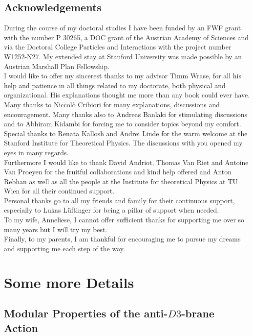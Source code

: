 \documentclass[12pt]{report}
\begin{document}
\section*{Acknowledgements}
During the course of my doctoral studies I have been funded by an FWF grant with the number P 30265, a DOC grant of the Austrian Academy of Sciences and via the Doctoral College Particles  and Interactions with the project  number W1252-N27. My extended stay at Stanford University was made possible by an Austrian Marshall Plan Fellowship.\\
I would like to offer my sincerest thanks to my advisor Timm Wrase, for all his help and patience in all things related to my doctorate, both physical and organizational. His explanations thought me more than any book could ever have.\\
Many thanks to Niccol\`o Cribiori for many explanations, discussions and encouragement. Many thanks also to Andreas Banlaki for stimulating discussions and to Abhiram Kidambi for forcing me to consider topics beyond my comfort.\\
Special thanks to Renata Kallosh and Andrei Linde for the warm welcome at the Stanford Institute for Theoretical Physics. The discussions with you opened my eyes in many regards.\\
Furthermore I would like to thank David Andriot, Thomas Van Riet and Antoine Van Proeyen for the fruitful collaborations and kind help offered and Anton Rebhan as well as all the people at the Institute  for theoretical Physics at TU Wien for all their continued support.\\
Personal thanks go to all my friends and family for their continuous support, especially to Lukas Lüftinger for being a pillar of support when needed.\\
To my wife, Anneliese, I cannot offer sufficient thanks for supporting me over so many years but I will try my best.\\
Finally, to my parents, I am thankful for encouraging me to pursue my dreams and supporting me each step of the way.


\appendix
\chapter{Some more Details}

\section{Modular Properties of the anti-$D3$-brane Action}
\label{app:modinv}
\end{document}
